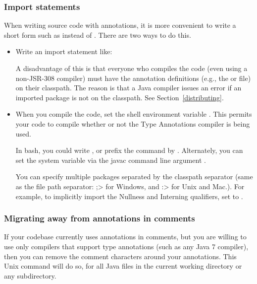 \subsubsection{Import statements\label{implicit-import-statements}}

When writing source code with annotations, it is more convenient to write a
short form such as  instead of
.  There are two ways to do this.

\begin{itemize}
\item
  Write an import statement like: 

  A disadvantage of this is that everyone who compiles the code
  (even using a non-JSR-308 compiler) must have the annotation definitions
  (e.g., the  or  file) on
  their classpath.  The reason is
  that a Java compiler issues an error if an imported package is not on the
  classpath.  See Section~\ref{distributing}.

\item
  \label{jsr308_imports}
  When you compile the code, set the shell environment variable
  .  This permits your code to compile whether or not
  the Type Annotations compiler is being used.

  In bash, you could write , or prefix the 
  command by  .
  Alternately, you can set the system variable via the javac command line
  argument .

  You can specify multiple packages separated by the classpath separator
  (same as the file path separator:   \<;> for Windows, and \<:> for Unix
  and Mac.).  For example, to
  implicitly import the Nullness and Interning qualifiers,
  set  to
  .  
\end{itemize}


\subsubsection{Migrating away from annotations in comments}

If your codebase currently uses annotations in comments, but you are
willing to use only compilers that support type annotations (such as any
Java 7 compiler), then you can remove the comment characters around your
annotations.  This Unix command will do so, for all Java files in the
current working directory or any subdirectory.

